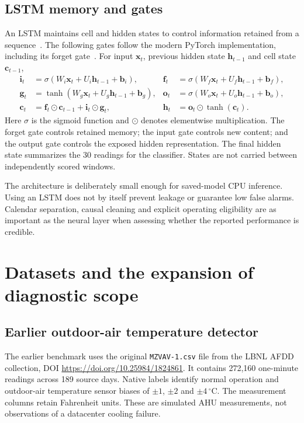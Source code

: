 \subsection{LSTM memory and gates}
An LSTM maintains cell and hidden states to control information retained from a sequence~\cite{hochreiter1997}. The following gates follow the modern PyTorch implementation, including its forget gate~\cite{pytorch}. For input $\mathbf{x}_t$, previous hidden state $\mathbf{h}_{t-1}$ and cell state $\mathbf{c}_{t-1}$,
\begin{align}
\mathbf{i}_t &= \sigma(W_i\mathbf{x}_t+U_i\mathbf{h}_{t-1}+\mathbf{b}_i), &
\mathbf{f}_t &= \sigma(W_f\mathbf{x}_t+U_f\mathbf{h}_{t-1}+\mathbf{b}_f),\\
\mathbf{g}_t &= \tanh(W_g\mathbf{x}_t+U_g\mathbf{h}_{t-1}+\mathbf{b}_g), &
\mathbf{o}_t &= \sigma(W_o\mathbf{x}_t+U_o\mathbf{h}_{t-1}+\mathbf{b}_o),\\
\mathbf{c}_t &= \mathbf{f}_t\odot\mathbf{c}_{t-1}+\mathbf{i}_t\odot\mathbf{g}_t, &
\mathbf{h}_t &= \mathbf{o}_t\odot\tanh(\mathbf{c}_t).
\end{align}
Here $\sigma$ is the sigmoid function and $\odot$ denotes elementwise multiplication. The forget gate controls retained memory; the input gate controls new content; and the output gate controls the exposed hidden representation. The final hidden state summarizes the 30 readings for the classifier. States are not carried between independently scored windows.

The architecture is deliberately small enough for saved-model CPU inference. Using an LSTM does not by itself prevent leakage or guarantee low false alarms. Calendar separation, causal cleaning and explicit operating eligibility are as important as the neural layer when assessing whether the reported performance is credible.

\section{Datasets and the expansion of diagnostic scope}
\subsection{Earlier outdoor-air temperature detector}
The earlier benchmark uses the original \texttt{MZVAV-1.csv} file from the LBNL AFDD collection, DOI \url{https://doi.org/10.25984/1824861}. It contains 272,160 one-minute readings across 189 source days. Native labels identify normal operation and outdoor-air temperature sensor biases of $\pm1$, $\pm2$ and $\pm4\,^{\circ}\mathrm{C}$. The measurement columns retain Fahrenheit units. These are simulated AHU measurements, not observations of a datacenter cooling failure.

